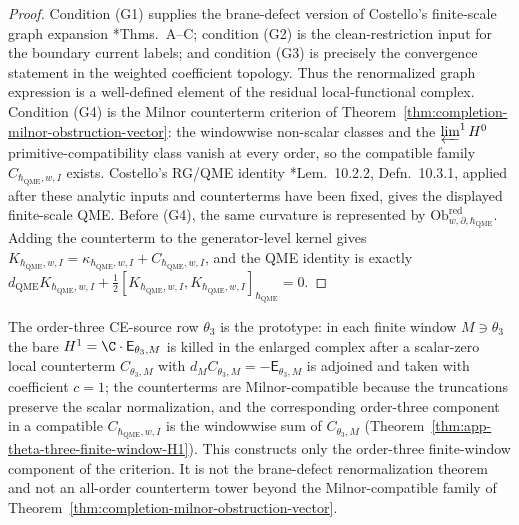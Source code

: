 \begin{proof}
Condition \textup{(G1)} supplies the brane-defect version of Costello's
finite-scale graph expansion
\cite{costello-renormalization}*{Thms.~A--C}; condition \textup{(G2)}
is the clean-restriction input for the boundary current labels; and
condition \textup{(G3)} is precisely the convergence statement in the
weighted coefficient topology.  Thus the renormalized graph expression
is a well-defined element of the residual local-functional complex.
Condition \textup{(G4)} is the Milnor counterterm criterion of
Theorem~\ref{thm:completion-milnor-obstruction-vector}: the windowwise
non-scalar classes and the \(\varprojlim^1H^0\) primitive-compatibility
class vanish at every order, so the compatible family
\(C_{\hbar_{\mathrm{QME}},w,I}\) exists.  Costello's RG/QME identity
\cite{costello-renormalization}*{Lem.~10.2.2, Defn.~10.3.1}, applied after these analytic
inputs and counterterms have been fixed, gives the displayed finite-scale
QME.  Before \textup{(G4)}, the same curvature is represented by
\(\mathrm{Ob}^{\mathrm{red}}_{w,\partial,\hbar_{\mathrm{QME}}}\).  Adding the
counterterm to the generator-level kernel gives
\(K_{\hbar_{\mathrm{QME}},w,I}=
\kappa_{\hbar_{\mathrm{QME}},w,I}+C_{\hbar_{\mathrm{QME}},w,I}\), and the QME identity
is exactly
\(d_{\mathrm{QME}}K_{\hbar_{\mathrm{QME}},w,I}
+\tfrac12[K_{\hbar_{\mathrm{QME}},w,I},
K_{\hbar_{\mathrm{QME}},w,I}]_{\hbar_{\mathrm{QME}}}=0\).
\end{proof}

\begin{rmk}
\label{rmk:completion-theta-three-prototype}
The order-three CE-source row \(\theta_3\) is the prototype: in
each finite window \(M\ni\theta_3\) the bare \(H^1=\C\cdot
\mathsf E_{\theta_3,M}\) is killed in the enlarged complex after a
scalar-zero local counterterm \(C_{\theta_3,M}\) with
\(d_M C_{\theta_3,M}=-\mathsf E_{\theta_3,M}\) is adjoined and taken
with coefficient \(c=1\); the counterterms are Milnor-compatible
because the truncations preserve the scalar normalization, and the
corresponding order-three component in a compatible
\(C_{\hbar_{\mathrm{QME}},w,I}\) is the windowwise sum
of \(C_{\theta_3,M}\) (Theorem~\ref{thm:app-theta-three-finite-window-H1}).
This constructs only the order-three finite-window component of the
criterion.  It is not the brane-defect renormalization theorem and not
an all-order counterterm tower beyond the Milnor-compatible family of
Theorem~\ref{thm:completion-milnor-obstruction-vector}.
\end{rmk}


